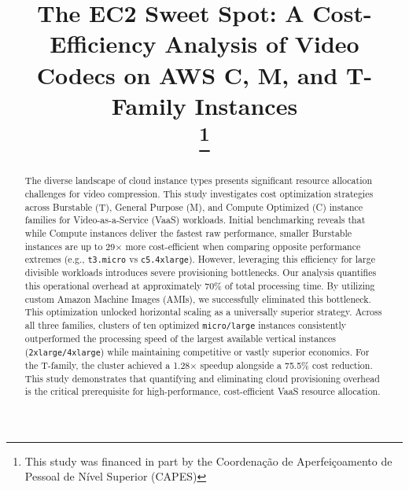 \documentclass[conference]{IEEEtran}
\begin{document}
	
	\title{The EC2 Sweet Spot: A Cost-Efficiency Analysis of Video Codecs on AWS C, M, and T-Family Instances\\
	\thanks{This study was financed in part by the Coordenação de Aperfeiçoamento de Pessoal de Nível Superior (CAPES)}
}
	
	\author{
		\and
	}
	
	\maketitle
	
	\begin{abstract}
		The diverse landscape of cloud instance types presents significant resource allocation challenges for video compression. This study investigates cost optimization strategies across Burstable (T), General Purpose (M), and Compute Optimized (C) instance families for Video-as-a-Service (VaaS) workloads. Initial benchmarking reveals that while Compute instances deliver the fastest raw performance, smaller Burstable instances are up to 29× more cost-efficient when comparing opposite performance extremes (e.g., \texttt{t3.micro} vs \texttt{c5.4xlarge}). However, leveraging this efficiency for large divisible workloads introduces severe provisioning bottlenecks. Our analysis quantifies this operational overhead at approximately 70\% of total processing time. By utilizing custom Amazon Machine Images (AMIs), we successfully eliminated this bottleneck. This optimization unlocked horizontal scaling as a universally superior strategy. Across all three families, clusters of ten optimized \texttt{micro/large} instances consistently outperformed the processing speed of the largest available vertical instances (\texttt{2xlarge/4xlarge}) while maintaining competitive or vastly superior economics. For the T-family, the cluster achieved a 1.28× speedup alongside a 75.5\% cost reduction. This study demonstrates that quantifying and eliminating cloud provisioning overhead is the critical prerequisite for high-performance, cost-efficient VaaS resource allocation.
	\end{abstract}
	
\end{document}
